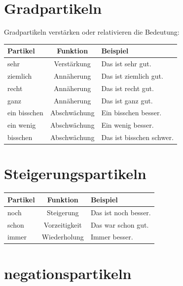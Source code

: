 \section{Gradpartikeln}
\label{sec:Gradpartikeln}

Gradpartikeln verstärken oder relativieren die Bedeutung:

\begin{center}
\begin{tabular}{|l|c|l|}
\hline
\textbf{Partikel} & \textbf{Funktion} & \textbf{Beispiel} \\ \hline
sehr & Verstärkung & Das ist sehr gut. \\ \hline
ziemlich & Annäherung & Das ist ziemlich gut. \\ \hline
recht & Annäherung & Das ist recht gut. \\ \hline
ganz & Annäherung & Das ist ganz gut. \\ \hline
ein bisschen & Abschwächung & Ein bisschen besser. \\ \hline
ein wenig & Abschwächung & Ein wenig besser. \\ \hline
bisschen & Abschwächung & Das ist bisschen schwer. \\ \hline
\end{tabular}
\end{center}

\section{Steigerungspartikeln}
\label{sec:Steigerungspartikeln}

\begin{center}
\begin{tabular}{|l|c|l|}
\hline
\textbf{Partikel} & \textbf{Funktion} & \textbf{Beispiel} \\ \hline
noch & Steigerung & Das ist noch besser. \\ \hline
schon & Vorzeitigkeit & Das war schon gut. \\ \hline
immer & Wiederholung & Immer besser. \\ \hline
\end{tabular}
\end{center}

\section{negationspartikeln}
\label{sec:Negationspartikeln}

